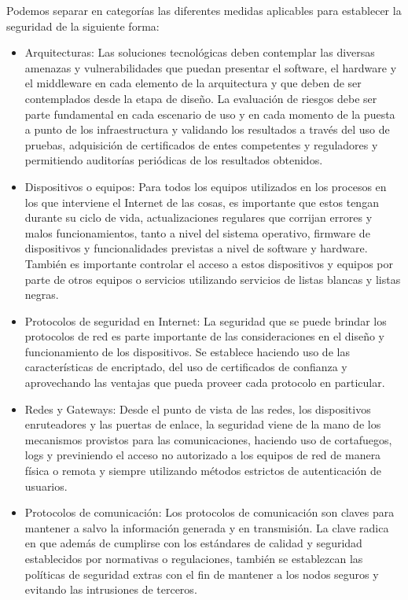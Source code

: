 Podemos separar en categorías las diferentes medidas aplicables para establecer la seguridad de la siguiente forma:

\begin{itemize}
\item Arquitecturas: Las soluciones tecnológicas deben contemplar las diversas amenazas y vulnerabilidades que puedan presentar el software, el hardware y el middleware en cada elemento de la arquitectura y que deben de ser contemplados desde la etapa de diseño. La evaluación de riesgos debe ser parte fundamental en cada escenario de uso y en cada momento de la puesta a punto de los infraestructura y validando los resultados a través del uso de pruebas, adquisición de certificados de entes competentes y reguladores y permitiendo auditorías periódicas de los resultados obtenidos.
\item Dispositivos o equipos: Para todos los equipos utilizados en los procesos en los que interviene el Internet de las cosas, es importante que estos tengan durante su ciclo de vida, actualizaciones regulares que corrijan errores y malos funcionamientos, tanto a nivel del sistema operativo, firmware de dispositivos y funcionalidades previstas a nivel de software y hardware. También es importante controlar el acceso a estos dispositivos y equipos por parte de otros equipos o servicios utilizando servicios de listas blancas y listas negras.
\item Protocolos de seguridad en Internet: La seguridad que se puede brindar los protocolos de red es parte importante de las consideraciones en el diseño y funcionamiento de los dispositivos. Se establece haciendo uso de las características de encriptado, del uso de certificados de confianza y aprovechando las ventajas que pueda proveer cada protocolo en particular.  
\item Redes y Gateways: Desde el punto de vista de las redes, los dispositivos enruteadores y las puertas de enlace, la seguridad viene de la mano de los mecanismos provistos para las comunicaciones, haciendo uso de cortafuegos, logs y previniendo el acceso no autorizado a los equipos de red de manera física o remota y siempre utilizando métodos estrictos de autenticación de usuarios.
\item Protocolos de comunicación: Los protocolos de comunicación son claves para mantener a salvo la información generada y en transmisión. La clave radica en que además de cumplirse con los estándares de calidad y seguridad establecidos por normativas o regulaciones, también se establezcan las políticas de seguridad extras con el fin de mantener a los nodos seguros y evitando las intrusiones de terceros.

\end{itemize}
